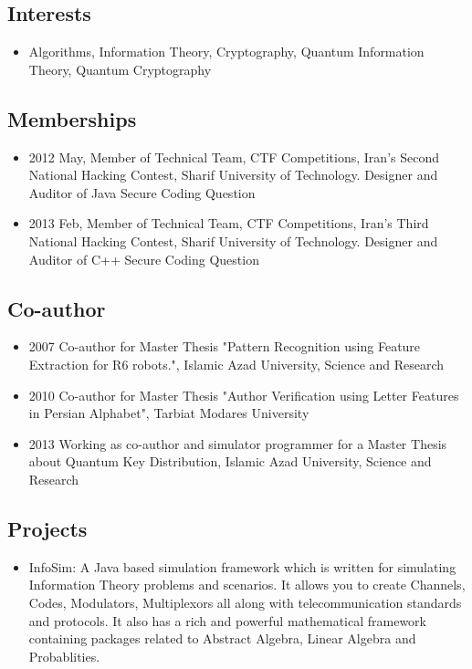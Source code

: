 \documentclass[12pt,a4paper]{article}
\begin{document}
	\subsection{Interests}
		\begin{itemize}
			\item Algorithms, Information Theory, Cryptography, Quantum Information Theory, Quantum Cryptography
		\end{itemize}
	\subsection{Memberships}
		\begin{itemize}
			\item 2012 May, Member of Technical Team, CTF Competitions, Iran's Second National Hacking Contest, Sharif University of Technology. Designer and Auditor of Java Secure Coding Question
			\item 2013 Feb, Member of Technical Team, CTF Competitions, Iran's Third National Hacking Contest, Sharif University of Technology. Designer and Auditor of C++ Secure Coding Question
		\end{itemize}
	\subsection{Co-author}
		\begin{itemize}
			\item 2007 Co-author for Master Thesis "Pattern Recognition using Feature Extraction for R6 robots.", Islamic Azad University, Science and Research
			\item 2010 Co-author for Master Thesis "Author Verification using Letter Features in Persian Alphabet", Tarbiat Modares University
			\item 2013 Working as co-author and simulator programmer for a Master Thesis about Quantum Key Distribution, Islamic Azad University, Science and Research
		\end{itemize}
	\subsection{Projects}
		\begin{itemize}
			\item InfoSim: A Java based simulation framework which is written for simulating Information Theory problems and scenarios. It allows you to create Channels, Codes, Modulators, Multiplexors all along with telecommunication standards and protocols. It also has a rich and powerful mathematical framework containing packages related to Abstract Algebra, Linear Algebra and Probablities.
		\end{itemize}
		
\end{document}
